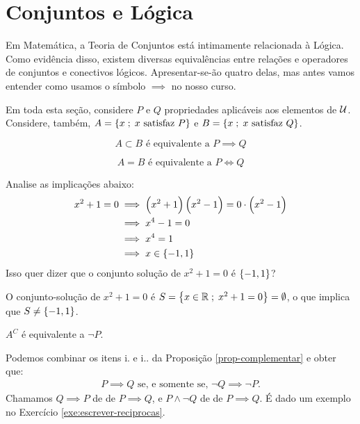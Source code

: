 \section{Conjuntos e Lógica}

\noindent
Em Matemática, a Teoria de Conjuntos está intimamente relacionada à Lógica.
Como evidência disso, existem diversas equivalências entre relações e operadores de conjuntos e conectivos lógicos.
Apresentar-se-ão quatro delas, mas antes vamos entender como usamos o símbolo $ \implies$ no nosso curso.

	\begin{remark}
	Em toda esta seção, considere $P$ e $Q$ propriedades aplicáveis aos elementos de $\mathcal{U}$.
	Considere, também, $A = \left\{ x \;;\; x \text{ satisfaz } P\right\}$ e $B= \left\{ x \;;\; x \text{ satisfaz } Q\right\}$.
	\end{remark}

\begin{equivalence} 
$$A \subset B \text{ é equivalente a } P \implies Q$$
\end{equivalence}

\begin{equivalence} 
	$$A=B \text{ é equivalente a } P \iff Q$$
\end{equivalence}

\begin{example}
Analise as implicações abaixo:
\begin{equation*}
\begin{aligned}
x^2+1=0 & \implies \left(x^2 +1 \right) \left( x^2-1 \right) = 0
\cdot \left( x^2-1 \right) \\
& \implies x^4 - 1 = 0 \\
& \implies x^4 = 1 \\
& \implies x \in \left\{ -1, 1\right\}
\end{aligned}
\end{equation*}
%
Isso quer dizer que o conjunto solução de $x^2 +1 = 0$ é $\left\{ -1,
1\right\}$?
\end{example}

\begin{solution}
O conjunto-solução de $x^2 + 1 = 0$ é $S = \left\{ x \in \mathbb{R} \;;\; x^2 + 1 = 0\right\} = \emptyset$, o que implica que $S \ne \left\{ -1,1\right\}$.
\end{solution}

\begin{equivalence} 
$A^C$ é equivalente a $\neg P$.
\end{equivalence}
Podemos combinar os itens i. e i.. da Proposição \ref{prop-complementar} e obter que:
%
\begin{align*}
P \implies Q \text{ se, e somente se, } \neg Q \implies \neg P.	
\end{align*}
%
Chamamos $Q \implies P$ de  de $P \implies Q$, e $P \land \neg Q$ de \newline de $P \implies Q$. É dado um exemplo no Exercício \ref{exe:escrever-reciprocas}.

